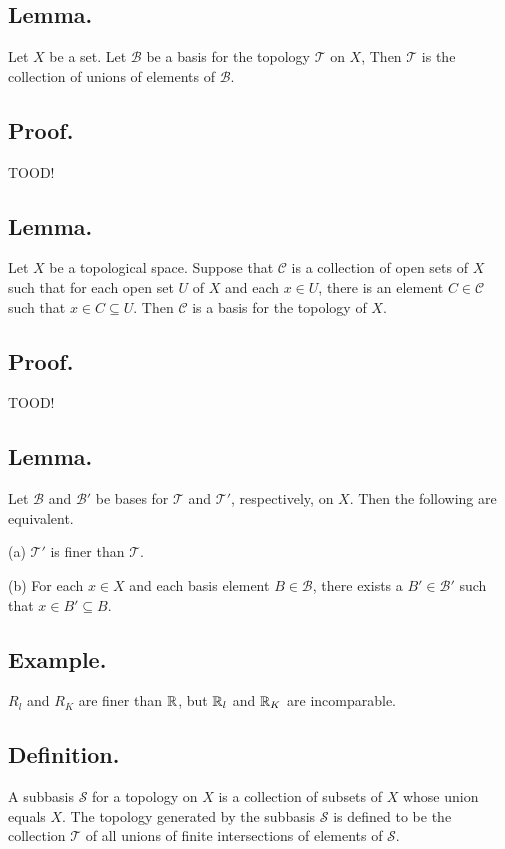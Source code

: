 \documentclass[titlepage]{article}
\begin{document}
\subsection{Lemma.} Let $X$ be a set. Let $\mathcal{B}$ be a basis for the topology $\mathcal{T}$ on $X$, Then $\mathcal{T}$ is the collection of unions of elements of $\mathcal{B}$.

\subsection{Proof.} TOOD!

\subsection{Lemma.} Let $X$ be a topological space. Suppose that $\mathcal{C}$ is a collection of open sets of $X$ such that for each open set $U$ of $X$ and each $x \in U$, there is an element $C \in \mathcal{C}$ such that $x \in C \subseteq U$. Then $\mathcal{C}$ is a basis for the topology of $X$.

\subsection{Proof.} TOOD!

\subsection{Lemma.} Let $\mathcal{B}$ and $\mathcal{B}'$ be bases for $\mathcal{T}$ and $\mathcal{T}'$, respectively, on $X$. Then the following are equivalent.

(a) $\mathcal{T}'$ is finer than $\mathcal{T}$.

(b) For each $x \in X$ and each basis element $B \in \mathcal{B}$, there exists a $B' \in \mathcal{B}'$ such that $x \in B' \subseteq B$.

\subsection{Example.} $R_{l}$ and $R_{K}$ are finer than $\mathbb{R}$, but $\mathbb{R}_{l}$ and $\mathbb{R}_{K}$ are incomparable.

\subsection{Definition.} A subbasis $\mathcal{S}$ for a topology on $X$ is a collection of subsets of $X$ whose union equals $X$. The topology generated by the subbasis $\mathcal{S}$ is defined to be the collection $\mathcal{T}$ of all unions of finite intersections of elements of $\mathcal{S}$.
\end{document}
